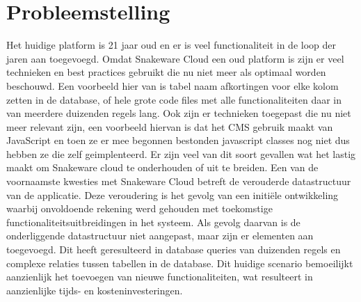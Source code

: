 \section{Probleemstelling}
Het huidige platform is 21 jaar oud en er is veel functionaliteit in de loop der jaren aan toegevoegd.
Omdat Snakeware Cloud een oud platform is zijn er veel technieken en best practices gebruikt die nu niet meer als optimaal worden beschouwd.
Een voorbeeld hier van is tabel naam afkortingen voor elke kolom zetten in de database, of hele grote code files met alle functionaliteiten daar in van meerdere duizenden regels lang. 
Ook zijn er technieken toegepast die nu niet meer relevant zijn, een voorbeeld hiervan is dat het \gls{CMS} gebruik maakt van JavaScript en toen ze er mee begonnen bestonden javascript classes nog niet dus hebben ze die zelf geimplenteerd.
Er zijn veel van dit soort gevallen wat het lastig maakt om Snakeware cloud te onderhouden of uit te breiden.
\whitespace
Een van de voornaamste kwesties met Snakeware Cloud betreft de verouderde datastructuur van de applicatie.
Deze veroudering is het gevolg van een initiële ontwikkeling waarbij onvoldoende rekening werd gehouden met toekomstige functionaliteitsuitbreidingen in het systeem.
Als gevolg daarvan is de onderliggende datastructuur niet aangepast, maar zijn er elementen aan toegevoegd.
Dit heeft geresulteerd in database queries van duizenden regels en complexe relaties tussen tabellen in de database.
Dit huidige scenario bemoeilijkt aanzienlijk het toevoegen van nieuwe functionaliteiten, wat resulteert in aanzienlijke tijds- en kosteninvesteringen.
